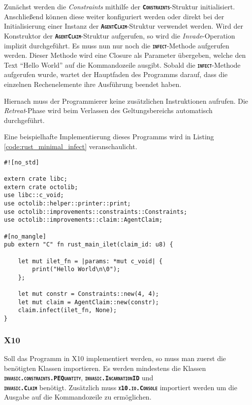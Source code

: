 Zunächst werden die \textit{Constraints} mithilfe der \texttt{\textsc{\textbf{Constraints}}}-Struktur initialisiert.
Anschließend können diese weiter konfiguriert werden oder direkt bei der Initialisierung einer Instanz der
\texttt{\textsc{\textbf{AgentClaim}}}-Struktur verwendet werden. Wird der Konstruktor
der \texttt{\textsc{\textbf{AgentClaim}}}-Struktur aufgerufen,
so wird die \textit{Invade}-Operation implizit durchgeführt.
Es muss nun nur noch die \texttt{\textsc{\textbf{infect}}}-Methode aufgerufen werden.
Dieser Methode wird eine Closure als Parameter übergeben, welche den
Text "`Hello World"' auf die Kommandozeile ausgibt. Sobald die \texttt{\textsc{\textbf{infect}}}-Methode
aufgerufen wurde, wartet der Hauptfaden des Programms darauf,
dass die einzelnen Rechenelemente ihre Ausführung beendet haben.

Hiernach muss der Programmierer keine zusätzlichen Instruktionen aufrufen. Die \textit{Retreat}-Phase wird beim
Verlassen des Geltungsbereichs automatisch durchgeführt.

Eine beispielhafte Implementierung dieses Programms wird in Listing \ref{code:rust_minimal_infect} veranschaulicht.

\lstset{basicstyle=\small}
\begin{lstlisting}[float,caption={Minimales Invade, Infect, Retreat in Rust},label=code:rust_minimal_infect]
#![no_std]

extern crate libc;
extern crate octolib;
use libc::c_void;
use octolib::helper::printer::print;
use octolib::improvements::constraints::Constraints;
use octolib::improvements::claim::AgentClaim;

#[no_mangle]
pub extern "C" fn rust_main_ilet(claim_id: u8) {

    let mut ilet_fn = |params: *mut c_void| {
        print("Hello World\n\0");
    };
    
    let mut constr = Constraints::new(4, 4);
    let mut claim = AgentClaim::new(constr);
    claim.infect(ilet_fn, None);
}
\end{lstlisting}
\lstset{basicstyle=\normalsize}

\subsubsection{X10}

Soll das Programm in X10 implementiert werden, so muss man zuerst die benötigten Klassen importieren. Es werden 
mindestens die Klassen \\
\texttt{\textsc{\textbf{invasic.constraints.PEQuantity}}},
\texttt{\textsc{\textbf{invasic.IncarnationID}}} und \\
\texttt{\textsc{\textbf{invasic.Claim}}}
benötigt. Zusätzlich muss \texttt{\textsc{\textbf{x10.io.Console}}} importiert werden
um die Ausgabe auf die Kommandozeile zu ermöglichen.

